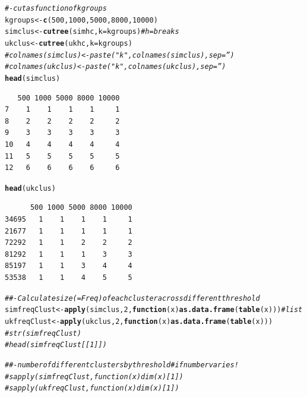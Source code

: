 \documentclass[]{revtex4}\usepackage[]{graphicx}\usepackage[]{color}
\makeatletter
\newcommand{\hlnum}[1]{\textcolor[rgb]{0.686,0.059,0.569}{#1}}%
\newcommand{\hlcom}[1]{\textcolor[rgb]{0.678,0.584,0.686}{\textit{#1}}}%
\newcommand{\hlstd}[1]{\textcolor[rgb]{0.345,0.345,0.345}{#1}}%
\newcommand{\hlkwa}[1]{\textcolor[rgb]{0.161,0.373,0.58}{\textbf{#1}}}%
\newcommand{\hlkwb}[1]{\textcolor[rgb]{0.69,0.353,0.396}{#1}}%
\newcommand{\hlkwc}[1]{\textcolor[rgb]{0.333,0.667,0.333}{#1}}%
\newcommand{\hlkwd}[1]{\textcolor[rgb]{0.737,0.353,0.396}{\textbf{#1}}}%
\newenvironment{kframe}{%
 \def\at@end@of@kframe{}%
 \ifinner\ifhmode%
  \def\at@end@of@kframe{\end{minipage}}%
  \begin{minipage}{\columnwidth}%
 \fi\fi%
 \def\FrameCommand##1{\hskip\@totalleftmargin \hskip-\fboxsep
 \colorbox{shadecolor}{##1}\hskip-\fboxsep
     \hskip-\linewidth \hskip-\@totalleftmargin \hskip\columnwidth}%
 \MakeFramed {\advance\hsize-\width
   \@totalleftmargin\z@ \linewidth\hsize
   \@setminipage}}%
 {\par\unskip\endMakeFramed%
 \at@end@of@kframe}
\newenvironment{knitrout}{}{} %
\makeatother
\begin{document}
\begin{knitrout}
\begin{kframe}
\begin{alltt}
\hlcom{#- cut as function of k groups}
\hlstd{kgroups} \hlkwb{<-} \hlkwd{c}\hlstd{(}\hlnum{500}\hlstd{,} \hlnum{1000}\hlstd{,} \hlnum{5000}\hlstd{,} \hlnum{8000}\hlstd{,} \hlnum{10000}\hlstd{)}
\hlstd{simclus} \hlkwb{<-} \hlkwd{cutree}\hlstd{(simhc,} \hlkwc{k} \hlstd{= kgroups )} \hlcom{# h = breaks}
\hlstd{ukclus} \hlkwb{<-} \hlkwd{cutree}\hlstd{(ukhc,}  \hlkwc{k} \hlstd{= kgroups )}
\hlcom{# colnames(simclus) <- paste("k",colnames(simclus),sep='')}
\hlcom{# colnames(ukclus) <- paste("k",colnames(ukclus),sep='')}
\hlkwd{head}\hlstd{(simclus)}
\end{alltt}
\begin{verbatim}
   500 1000 5000 8000 10000
7    1    1    1    1     1
8    2    2    2    2     2
9    3    3    3    3     3
10   4    4    4    4     4
11   5    5    5    5     5
12   6    6    6    6     6
\end{verbatim}
\begin{alltt}
\hlkwd{head}\hlstd{(ukclus)}
\end{alltt}
\begin{verbatim}
      500 1000 5000 8000 10000
34695   1    1    1    1     1
21677   1    1    1    1     1
72292   1    1    2    2     2
81292   1    1    1    3     3
85197   1    1    3    4     4
53538   1    1    4    5     5
\end{verbatim}
\begin{alltt}
\hlcom{##- Calculate size(=Freq) of each cluster across different threshold}
\hlstd{simfreqClust} \hlkwb{<-} \hlkwd{apply}\hlstd{(simclus,} \hlnum{2}\hlstd{,} \hlkwa{function}\hlstd{(}\hlkwc{x}\hlstd{)} \hlkwd{as.data.frame}\hlstd{(}\hlkwd{table}\hlstd{(x)))} \hlcom{# list}
\hlstd{ukfreqClust} \hlkwb{<-} \hlkwd{apply}\hlstd{(ukclus,} \hlnum{2}\hlstd{,} \hlkwa{function}\hlstd{(}\hlkwc{x}\hlstd{)} \hlkwd{as.data.frame}\hlstd{(}\hlkwd{table}\hlstd{(x)))}
\hlcom{# str(simfreqClust)}
\hlcom{# head(simfreqClust[[1]])}

\hlcom{##- number of different clusters by threshold # if number varies !}
\hlcom{# sapply(simfreqClust, function(x) dim(x)[1])}
\hlcom{# sapply(ukfreqClust, function(x) dim(x)[1])}


\end{alltt}
\end{kframe}
\end{knitrout}
\end{document}

